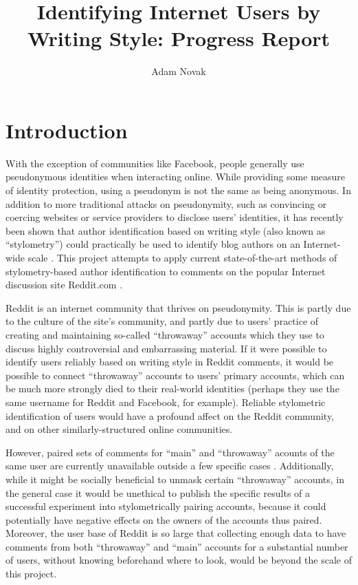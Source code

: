 \documentclass{article}
\author{Adam Novak}
\title{Identifying Internet Users by Writing Style: Progress Report}
\begin{document}
\maketitle

\begin{abstract}
\end{abstract}

\section{Introduction}
With the exception of communities like Facebook, people generally use pseudonymous identities when interacting online. While providing some measure of identity protection, using a pseudonym is not the same as being anonymous. In addition to more traditional attacks on pseudonymity, such as convincing or coercing websites or service providers to disclose users' identities, it has recently been shown that author identification based on writing style (also known as ``stylometry'') could practically be used to identify blog authors on an Internet-wide scale \cite{narayanan2012feasibility}. This project attempts to apply current state-of-the-art methods of stylometry-based author identification to comments on the popular Internet discussion site Reddit.com \cite{reddit2012reddit}.

Reddit is an internet community that thrives on pseudonymity. This is partly due to the culture of the site's community, and partly due to users' practice of creating and maintaining so-called ``throwaway'' accounts which they use to discuss highly controversial and embarrassing material. If it were possible to identify users reliably based on writing style in Reddit comments, it would be possible to connect ``throwaway'' accounts to users' primary accounts, which can be much more strongly died to their real-world identities (perhaps they use the same username for Reddit and Facebook, for example). Reliable stylometric identification of users would have a profound affect on the Reddit community, and on other similarly-structured online communities.

However, paired sets of comments for ``main'' and ``throwaway'' acounts of the same user are currently unavailable outside a few specific cases \cite{chen2012unmasking, fitzpatrick2012man}. Additionally, while it might be socially beneficial to unmask certain ``throwaway'' accounts, in the general case it would be unethical to publish the specific results of a successful experiment into stylometrically pairing accounts, because it could potentially have negative effects on the owners of the accounts thus paired. Moreover, the user base of Reddit is so large that collecting enough data to have comments from both ``throwaway'' and ``main'' accounts for a substantial number of users, without knowing beforehand where to look, would be beyond the scale of this project.
\end{document}
